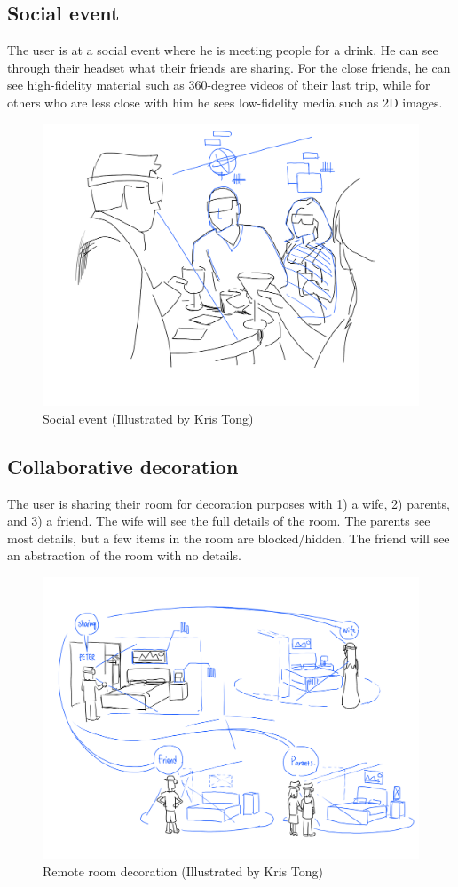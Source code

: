 \subsection{Social event}

The user is at a social event where he is meeting people for a drink. He can see through their headset what their friends are sharing. For the close friends, he can see high-fidelity material such as 360-degree videos of their last trip, while for others who are less close with him he sees low-fidelity media such as 2D images. 

\begin{figure}[H]
    \centering
    \includegraphics[width=.8\linewidth]{images/illustrations/3_Bar_Scene.png}
    \caption{Social event (Illustrated by Kris Tong)}
    \label{fig:illustration:social-event}
\end{figure}

\subsection{Collaborative decoration}

The user is sharing their room for decoration purposes with 1) a wife, 2) parents, and 3) a friend. The wife will see the full details of the room. The parents see most details, but a few items in the room are blocked/hidden. The friend will see an abstraction of the room with no details. 

\begin{figure}[H]
    \centering
    \includegraphics[width=.8\linewidth]{images/illustrations/1_Remote_Bed.png}
    \caption{Remote room decoration (Illustrated by Kris Tong)}
    \label{fig:illustration:remote-bed}
\end{figure}

